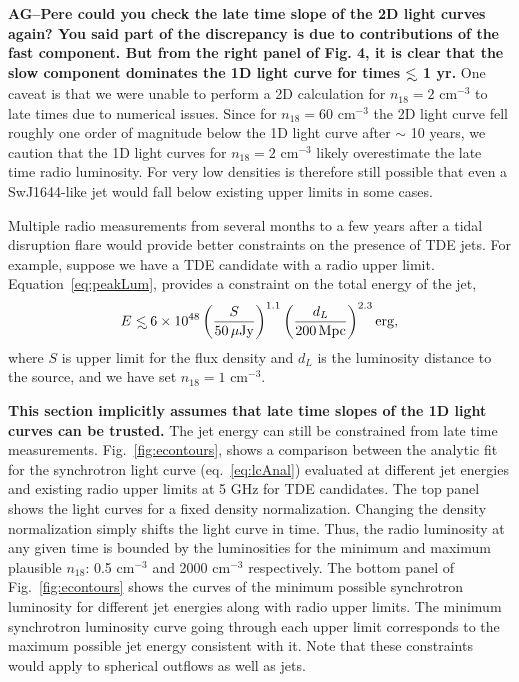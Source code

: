 \documentclass[usenatbib,fleqn]{mnras}
\newcommand\lsim{\mathrel{\rlap{\lower4pt\hbox{\hskip1pt$\sim$}}
    \raise1pt\hbox{$<$}}}
\begin{document}
{\bf AG--Pere could you check the late time slope of the 2D light
  curves again? You said part of the discrepancy is due to
  contributions of the fast component. But from the right panel of
  Fig. 4, it is clear that the slow component dominates the 1D light
  curve for times $\lsim$ 1 yr.}  One caveat is that we were unable to
perform a 2D calculation for $n_{18}=2$ cm$^{-3}$ to late times due to
numerical issues.  Since for $n_{18}=60$ cm$^{-3}$ the 2D light curve
fell roughly one order of magnitude below the 1D light curve after
$\sim$ 10 years, we caution that the 1D light curves for $n_{18}=2$
cm$^{-3}$ likely overestimate the late time radio luminosity.  For
very low densities is therefore still possible that even a
SwJ1644-like jet would fall below existing upper limits in some cases.

Multiple radio measurements from several months to a few years after a
tidal disruption flare would provide better constraints on the
presence of TDE jets. For example, suppose we have a TDE candidate
with a radio upper limit. Equation~\eqref{eq:peakLum}, provides a
constraint on the total energy of the jet,
\begin{equation}
E\lsim 6 \times 10^{48} \left(\frac{S}{50 \,\mu{\rm Jy}}\right)^{1.1}
  \left(\frac{d_L}{200 \,{\rm Mpc}}\right)^{2.3} {\rm erg},
\end{equation}
%
where $S$ is upper limit for the flux density and $d_L$ is the
luminosity distance to the source, and we have set $n_{18}=1$
cm$^{-3}$.

{\bf This section implicitly assumes that late time slopes of the 1D
  light curves can be trusted.}  The jet energy can still be
constrained from late time measurements. Fig.~\ref{fig:econtours},
shows a comparison between the analytic fit for the synchrotron light
curve (eq.~\ref{eq:lcAnal}) evaluated at different jet energies and
existing radio upper limits at 5 GHz for TDE candidates. The top panel
shows the light curves for a fixed density normalization. Changing the
density normalization simply shifts the light curve in time. Thus, the
radio luminosity at any given time is bounded by the luminosities for
the minimum and maximum plausible $n_{18}$: 0.5 cm$^{-3}$ and 2000
cm$^{-3}$ respectively. The bottom panel of Fig.~\ref{fig:econtours}
shows the curves of the minimum possible synchrotron luminosity for
different jet energies along with radio upper limits. The minimum
synchrotron luminosity curve going through each upper limit
corresponds to the maximum possible jet energy consistent with
it. Note that these constraints would apply to spherical outflows as
well as jets.
\end{document}
